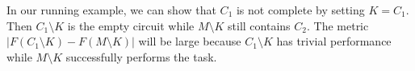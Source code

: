 In our running example, we can show that  $C_1$ is not complete by setting $K=C_1$. Then $C_1 \setminus K$ is the empty circuit while $M\setminus K$ still contains $C_2$. The metric $|F(C_1 \setminus K)- F(M \setminus K)|$ will be large because $C_1 \setminus K$ has trivial performance while $M \setminus K$ successfully performs the task.


